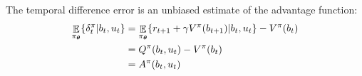 The temporal difference error is an unbiased estimate of the advantage function:
\begin{align}
  \displaystyle \mathop \mathbb{E}_{\pi_{\boldsymbol{\theta}}} \{ \delta^{\pi}_t|b_t,u_t\} &=  \mathop\mathbb{E}_{\pi_{\boldsymbol{\theta}}}\{ r_{t+1} + \gamma V^{\pi}(b_{t+1})|b_t,u_t\} - V^{\pi}(b_t) \nonumber \\
									   &= Q^{\pi}(b_t,u_t) - V^{\pi}(b_t) \nonumber \\
									   &= A^{\pi}(b_t,u_t)
\end{align}
